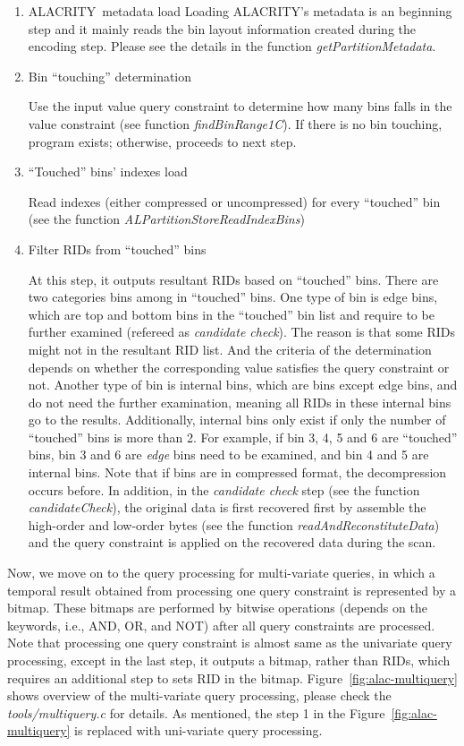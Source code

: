 \documentclass[11pt,a4paper]{article}
\newcommand{\alac}{ALACRITY}
\begin{document}
\begin{enumerate}
\item \alac\ metadata load 
Loading \alac's metadata is an beginning step and it mainly reads the bin layout information created during the encoding step. Please see the details in the function \emph{getPartitionMetadata}. 

\item Bin ``touching'' determination

Use the input value query constraint to determine how many bins falls in the value constraint (see function \emph{findBinRange1C}). 
If there is no bin touching, program exists; otherwise, proceeds to next step. 

\item ``Touched'' bins' indexes load

Read indexes (either compressed or uncompressed) for every ``touched'' bin (see the function \emph{ALPartitionStoreReadIndexBins})

\item Filter RIDs from ``touched'' bins

At this step, it outputs resultant RIDs based on ``touched'' bins. 
There are two categories bins among in ``touched'' bins. 
One type of bin is edge bins, which are top and bottom bins in the ``touched'' bin list and require to be further examined (refereed as \emph{candidate check}). 
The reason is that some RIDs might not in the resultant RID list. 
And the criteria of the determination depends on whether the corresponding value satisfies the query constraint or not. 
Another type of bin is internal bins, which are bins except edge bins, and do not need the further examination, meaning all RIDs in these internal bins go to the results.
Additionally, internal bins only exist if only the number of ``touched'' bins is more than 2. 
For example, if bin 3, 4, 5 and 6 are ``touched'' bins, bin 3 and 6 are \emph{edge} bins need to be examined, and bin 4 and 5 are internal bins. 
Note that if bins are in compressed format, the decompression occurs before. 
In addition, in the \emph{candidate check} step (see the function \emph{candidateCheck}), the original data is first recovered first by assemble the high-order and low-order bytes (see the function \emph{readAndReconstituteData}) and the query constraint is applied on the recovered data during the scan. 
\end{enumerate}

Now, we move on to the query processing for multi-variate queries, in which a temporal result obtained from processing one query constraint is represented by a bitmap. 
These bitmaps are performed by bitwise operations (depends on the keywords, i.e., AND, OR, and NOT) after all query constraints are processed. 
Note that processing one query constraint is almost same as the univariate query processing, except in the last step, it outputs a bitmap, rather than RIDs, which requires an additional step to sets RID in the bitmap. 
Figure~\ref{fig:alac-multiquery} shows overview of the multi-variate query processing, please check the \emph{tools\//multiquery.c} for details.  
As mentioned, the step 1 in the Figure~\ref{fig:alac-multiquery} is replaced with uni-variate query processing. 
\end{document}
